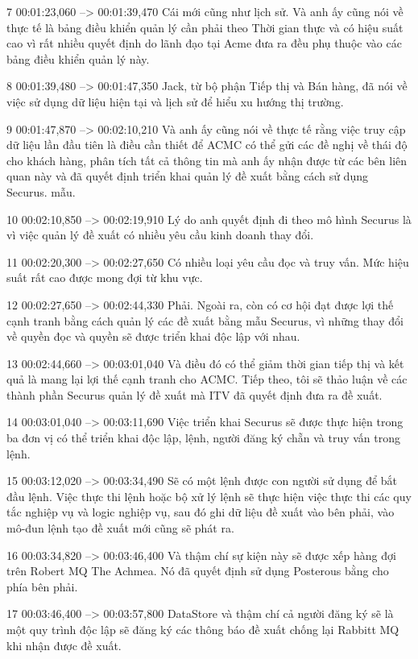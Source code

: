 7
00:01:23,060 --> 00:01:39,470
Cái mới cũng như lịch sử.  Và anh ấy cũng nói về thực tế là bảng điều khiển quản lý cần phải theo Thời gian thực và có hiệu suất cao vì rất nhiều quyết định do lãnh đạo tại Acme đưa ra đều phụ thuộc vào các bảng điều khiển quản lý này.

8
00:01:39,480 --> 00:01:47,350
Jack, từ bộ phận Tiếp thị và Bán hàng, đã nói về việc sử dụng dữ liệu hiện tại và lịch sử để hiểu xu hướng thị trường.

9
00:01:47,870 --> 00:02:10,210
Và anh ấy cũng nói về thực tế rằng việc truy cập dữ liệu lần đầu tiên là điều cần thiết để ACMC có thể gửi các đề nghị về thái độ cho khách hàng, phân tích tất cả thông tin mà anh ấy nhận được từ các bên liên quan này và đã quyết định triển khai quản lý đề xuất bằng cách sử dụng Securus.  mẫu.

10
00:02:10,850 --> 00:02:19,910
Lý do anh quyết định đi theo mô hình Securus là vì việc quản lý đề xuất có nhiều yêu cầu kinh doanh thay đổi.

11
00:02:20,300 --> 00:02:27,650
Có nhiều loại yêu cầu đọc và truy vấn.  Mức hiệu suất rất cao được mong đợi từ khu vực.

12
00:02:27,650 --> 00:02:44,330
Phải.  Ngoài ra, còn có cơ hội đạt được lợi thế cạnh tranh bằng cách quản lý các đề xuất bằng mẫu Securus, vì những thay đổi về quyền đọc và quyền sẽ được triển khai độc lập với nhau.

13
00:02:44,660 --> 00:03:01,040
Và điều đó có thể giảm thời gian tiếp thị và kết quả là mang lại lợi thế cạnh tranh cho ACMC.  Tiếp theo, tôi sẽ thảo luận về các thành phần Securus quản lý đề xuất mà ITV đã quyết định đưa ra đề xuất.

14
00:03:01,040 --> 00:03:11,690
Việc triển khai Securus sẽ được thực hiện trong ba đơn vị có thể triển khai độc lập, lệnh, người đăng ký chẵn và truy vấn trong lệnh.

15
00:03:12,020 --> 00:03:34,490
Sẽ có một lệnh được con người sử dụng để bắt đầu lệnh.  Việc thực thi lệnh hoặc bộ xử lý lệnh sẽ thực hiện việc thực thi các quy tắc nghiệp vụ và logic nghiệp vụ, sau đó ghi dữ liệu đề xuất vào bên phải, vào mô-đun lệnh tạo đề xuất mới cũng sẽ phát ra.

16
00:03:34,820 --> 00:03:46,400
Và thậm chí sự kiện này sẽ được xếp hàng đợi trên Robert MQ The Achmea.  Nó đã quyết định sử dụng Posterous bằng cho phía bên phải.

17
00:03:46,400 --> 00:03:57,800
DataStore và thậm chí cả người đăng ký sẽ là một quy trình độc lập sẽ đăng ký các thông báo đề xuất chống lại Rabbitt MQ khi nhận được đề xuất.

